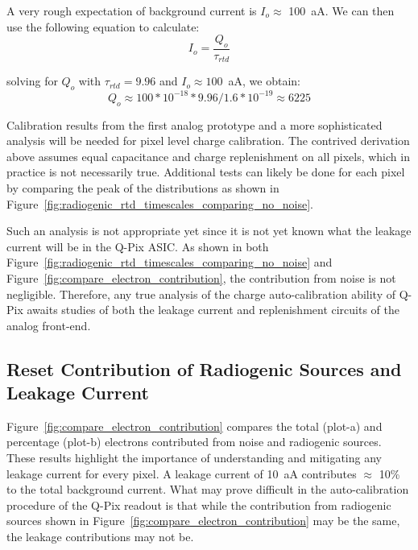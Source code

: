 A very rough expectation of background current is $I_o \approx$ 100~\unit{aA}.
We can then use the following equation to calculate:
\begin{equation}
I_{o} = \frac{Q_{o}}{\tau_{rtd}}
\end{equation}

solving for $Q_{o}$ with $\tau_{rtd} = 9.96$ and $I_{o} \approx 100$~\unit{aA}, we obtain:
\begin{equation}
Q_{o} \approx 100*10^{-18} * 9.96 / 1.6*10^{-19} \approx 6225
\end{equation}

Calibration results from the first analog prototype and a more sophisticated analysis will be needed for pixel level charge calibration.
The contrived derivation above assumes equal capacitance and charge replenishment on all pixels, which in practice is not necessarily true.
Additional tests can likely be done for each pixel by comparing the peak of the distributions as shown in Figure~\ref{fig:radiogenic_rtd_timescales_comparing_no_noise}.

Such an analysis is not appropriate yet since it is not yet known what the leakage current will be in the Q-Pix ASIC.
As shown in both Figure~\ref{fig:radiogenic_rtd_timescales_comparing_no_noise} and Figure~\ref{fig:compare_electron_contribution}, the contribution from noise is not negligible.
Therefore, any true analysis of the charge auto-calibration ability of Q-Pix awaits studies of both the leakage current and replenishment circuits of the analog front-end.

\subsection{Reset Contribution of Radiogenic Sources and Leakage Current}
Figure~\ref{fig:compare_electron_contribution} compares the total (plot-a) and percentage (plot-b) electrons contributed from noise and radiogenic sources.
These results highlight the importance of understanding and mitigating any leakage current for every pixel.
A leakage current of 10~\unit{aA} contributes $\approx$ 10\% to the total background current.
What may prove difficult in the auto-calibration procedure of the Q-Pix readout is that while the contribution from radiogenic sources shown in Figure~\ref{fig:compare_electron_contribution} may be the same, the leakage contributions may not be.

